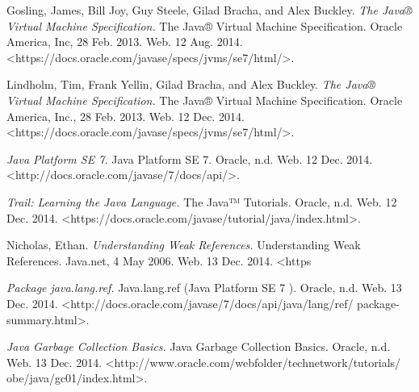 \documentclass[fleqn,10pt]{SelfArx} %
\begin{document}
\begin{thebibliography}{9}

   Gosling, James, Bill Joy, Guy Steele, Gilad Bracha, and Alex Buckley. \textit{The Java® Virtual Machine Specification.} The Java® Virtual Machine Specification. Oracle America, Inc, 28 Feb. 2013. Web. 12 Aug. 2014. <https://docs.oracle.com/javase/specs/jvms/se7/html/>.

Lindholm, Tim, Frank Yellin, Gilad Bracha, and Alex Buckley. \textit{The Java® Virtual Machine Specification.} The Java® Virtual Machine Specification. Oracle America, Inc., 28 Feb. 2013. Web. 12 Dec. 2014. <https://docs.oracle.com/javase/specs/jvms/se7/html/>.

\textit{Java Platform SE 7.} Java Platform SE 7. Oracle, n.d. Web. 12 Dec. 2014. <http://docs.oracle.com/javase/7/docs/api/>.

\textit{Trail: Learning the Java Language.} The Java™ Tutorials. Oracle, n.d. Web. 12 Dec. 2014. <https://docs.oracle.com/javase/tutorial/java/index.html>.

Nicholas, Ethan. \textit{Understanding Weak References.} Understanding Weak References. Java.net, 4 May 2006. Web. 13 Dec. 2014. <https%

\textit{Package java.lang.ref.} Java.lang.ref (Java Platform SE 7 ). Oracle, n.d. Web. 13 Dec. 2014. <http://docs.oracle.com/javase/7/docs/api/java/lang/ref/ package-summary.html>.

\textit{Java Garbage Collection Basics.} Java Garbage Collection Basics. Oracle, n.d. Web. 13 Dec. 2014. <http://www.oracle.com/webfolder/technetwork/tutorials/ obe/java/gc01/index.html>.




\end{thebibliography}

\end{document}
